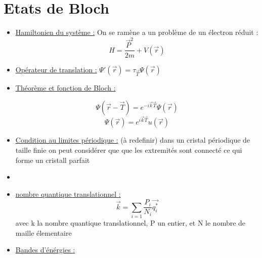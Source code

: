 \documentclass{article}
\begin{document}
\section{Etats de Bloch }
\begin{itemize}
    \item \underline{Hamiltonien du système :} On se ramène a un problème de un électron réduit :
    $$H=\frac{\vec{P}^2}{2m}+V(\vec{r})$$
    \item \underline{Opérateur de translation :} $\Psi ' (\vec{r})=\tau_{\vec{T}}\Psi (\vec{r})$
    \item \underline{Théorème et fonction de Bloch :}
    \begin{mdframed}[linecolor=red,linewidth=2pt,leftmargin=100pt,rightmargin=100pt,innertopmargin=0pt]
    $$\Psi(\vec{r}-\vec{T})=e^{-i\vec{k}\vec{T}}\Psi(\vec{r})$$
    $$\Psi(\vec{r})=e^{i\vec{k}\vec{T}}u(\vec{r})$$
    \end{mdframed}
    \item \underline{Condition au limites périodique :} (à redefinir) dans un cristal périodique de taille finie on peut considérer que que les extremités sont connecté ce qui forme un cristall parfait
    \item \item \underline{nombre quantique translationnel :}
    $$\vec{k}=\sum_{i=1}\frac{P_i}{N_i}\vec{q_i^*}$$
    avec k la nombre quantique translationnel, P un entier, et N le nombre de maille élementaire
    \item \underline{Bandes d'énérgies :} 
\end{itemize}
\end{document}
